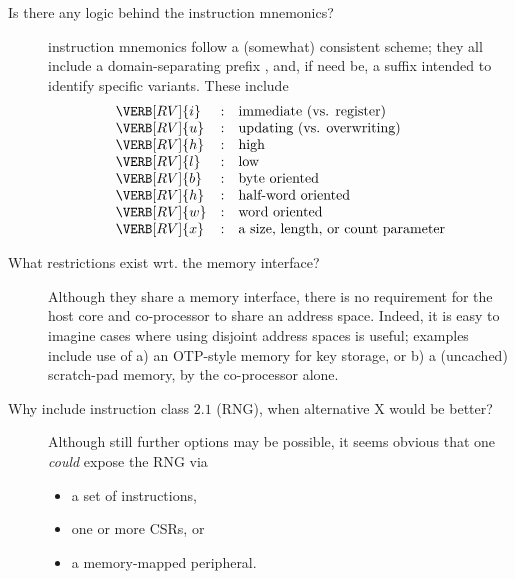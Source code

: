
%
%
%
%


\begin{description}

\item[Is there any logic behind the \XCRYPTO instruction mnemonics?]
      \XCRYPTO instruction mnemonics follow a (somewhat) consistent scheme; 
      they all include a domain-separating prefix , and, if
      need be, a suffix intended to identify specific variants.  These 
      include
      \[
      \begin{array}{lcl}
      \VERB[RV]{i} &:& \mbox{immediate (vs. register)   }        \\
      \VERB[RV]{u} &:& \mbox{updating  (vs. overwriting)}        \\
      \VERB[RV]{h} &:& \mbox{high}                               \\
      \VERB[RV]{l} &:& \mbox {low}                               \\
      \VERB[RV]{b} &:& \mbox     {byte oriented}                 \\
      \VERB[RV]{h} &:& \mbox{half-word oriented}                 \\
      \VERB[RV]{w} &:& \mbox     {word oriented}                 \\
      \VERB[RV]{x} &:& \mbox{a size, length, or count parameter} \\
      \end{array}
      \]

\item[What restrictions exist wrt. the \XCRYPTO memory interface?]
      Although they share a memory interface, there is no requirement for
      the host core and co-processor to share an address space.  Indeed,
      it is easy to imagine cases where using disjoint address spaces is
      useful; examples include use of
      a) an OTP-style memory for key storage, 
         or
      b) a (uncached) scratch-pad memory,
      by the co-processor alone.


\item[Why include instruction class $2.1$ (RNG), when alternative X would be better?]
      Although still further options may be possible, it seems obvious
      that one {\em could} expose the RNG via

      \begin{itemize}
      \item a set of instructions,
      \item one or more CSRs,
            or
      \item a memory-mapped peripheral.
      \end{itemize}


\end{description}
